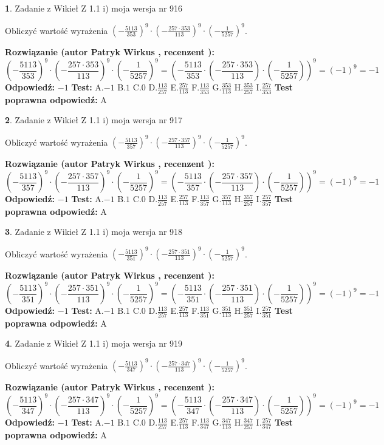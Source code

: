 \documentclass[12pt, a4paper]{article}
\theoremstyle{definition} %
\newtheorem{zad}{}
\newcommand{\zadStart}[1]{\begin{zad}#1\newline}
\newcommand{\zadStop}{\end{zad}}
\newcommand{\rozwStart}[2]{\noindent \textbf{Rozwiązanie (autor #1 , recenzent #2): }\newline}
\newcommand{\rozwStop}{\newline}
\newcommand{\odpStart}{\noindent \textbf{Odpowiedź:}\newline}
\newcommand{\odpStop}{\newline}
\newcommand{\testStart}{\noindent \textbf{Test:}\newline}
\newcommand{\testStop}{\newline}
\newcommand{\kluczStart}{\noindent \textbf{Test poprawna odpowiedź:}\newline}
\newcommand{\kluczStop}{\newline}
\begin{document}
\zadStart{Zadanie z Wikieł Z 1.1 i) moja wersja nr 916}

Obliczyć wartość wyrażenia $(-\frac{5113}{353})^{9} \cdot (-\frac{257 \cdot 353}{113})^{9} \cdot (-\frac{1}{5257})^{9}$.
\zadStop
\rozwStart{Patryk Wirkus}{}
$$(-\frac{5113}{353})^{9} \cdot (-\frac{257 \cdot 353}{113})^{9} \cdot (-\frac{1}{5257})^{9} = (-\frac{5113}{353} \cdot (-\frac{257 \cdot 353}{113}) \cdot (-\frac{1}{5257}))^{9} = (-1)^{9} = -1$$
\rozwStop
\odpStart
$-1$
\odpStop
\testStart
A.$-1$ B.$1$ C.$0$ D.$\frac{113}{257}$ E.$\frac{257}{113}$
F.$\frac{113}{353}$ G.$\frac{353}{113}$
H.$\frac{353}{257}$
I.$\frac{257}{353}$
\testStop
\kluczStart
A
\kluczStop



\zadStart{Zadanie z Wikieł Z 1.1 i) moja wersja nr 917}

Obliczyć wartość wyrażenia $(-\frac{5113}{357})^{9} \cdot (-\frac{257 \cdot 357}{113})^{9} \cdot (-\frac{1}{5257})^{9}$.
\zadStop
\rozwStart{Patryk Wirkus}{}
$$(-\frac{5113}{357})^{9} \cdot (-\frac{257 \cdot 357}{113})^{9} \cdot (-\frac{1}{5257})^{9} = (-\frac{5113}{357} \cdot (-\frac{257 \cdot 357}{113}) \cdot (-\frac{1}{5257}))^{9} = (-1)^{9} = -1$$
\rozwStop
\odpStart
$-1$
\odpStop
\testStart
A.$-1$ B.$1$ C.$0$ D.$\frac{113}{257}$ E.$\frac{257}{113}$
F.$\frac{113}{357}$ G.$\frac{357}{113}$
H.$\frac{357}{257}$
I.$\frac{257}{357}$
\testStop
\kluczStart
A
\kluczStop



\zadStart{Zadanie z Wikieł Z 1.1 i) moja wersja nr 918}

Obliczyć wartość wyrażenia $(-\frac{5113}{351})^{9} \cdot (-\frac{257 \cdot 351}{113})^{9} \cdot (-\frac{1}{5257})^{9}$.
\zadStop
\rozwStart{Patryk Wirkus}{}
$$(-\frac{5113}{351})^{9} \cdot (-\frac{257 \cdot 351}{113})^{9} \cdot (-\frac{1}{5257})^{9} = (-\frac{5113}{351} \cdot (-\frac{257 \cdot 351}{113}) \cdot (-\frac{1}{5257}))^{9} = (-1)^{9} = -1$$
\rozwStop
\odpStart
$-1$
\odpStop
\testStart
A.$-1$ B.$1$ C.$0$ D.$\frac{113}{257}$ E.$\frac{257}{113}$
F.$\frac{113}{351}$ G.$\frac{351}{113}$
H.$\frac{351}{257}$
I.$\frac{257}{351}$
\testStop
\kluczStart
A
\kluczStop



\zadStart{Zadanie z Wikieł Z 1.1 i) moja wersja nr 919}

Obliczyć wartość wyrażenia $(-\frac{5113}{347})^{9} \cdot (-\frac{257 \cdot 347}{113})^{9} \cdot (-\frac{1}{5257})^{9}$.
\zadStop
\rozwStart{Patryk Wirkus}{}
$$(-\frac{5113}{347})^{9} \cdot (-\frac{257 \cdot 347}{113})^{9} \cdot (-\frac{1}{5257})^{9} = (-\frac{5113}{347} \cdot (-\frac{257 \cdot 347}{113}) \cdot (-\frac{1}{5257}))^{9} = (-1)^{9} = -1$$
\rozwStop
\odpStart
$-1$
\odpStop
\testStart
A.$-1$ B.$1$ C.$0$ D.$\frac{113}{257}$ E.$\frac{257}{113}$
F.$\frac{113}{347}$ G.$\frac{347}{113}$
H.$\frac{347}{257}$
I.$\frac{257}{347}$
\testStop
\kluczStart
A
\kluczStop
\end{document}
